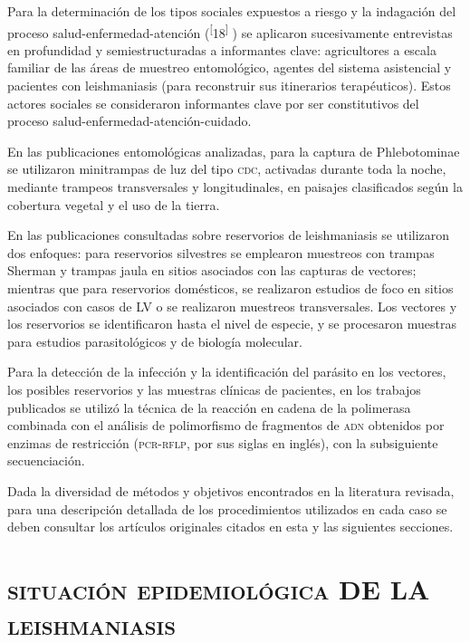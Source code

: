\documentclass{article}
\begin{document}
Para la determinación de los tipos sociales expuestos a riesgo y la indagación
del proceso salud-enfermedad-atención (\textsuperscript{[}18\textsuperscript{]}
) se aplicaron sucesivamente entrevistas en profundidad y semiestructuradas a
informantes clave: agricultores a escala familiar de las áreas de muestreo
entomológico, agentes del sistema asistencial y pacientes con leishmaniasis
(para reconstruir sus itinerarios terapéuticos). Estos actores sociales se
consideraron informantes clave por ser constitutivos del proceso
salud-enfermedad-atención-cuidado.

En las publicaciones entomológicas analizadas, para la captura de Phlebotominae
se utilizaron minitrampas de luz del tipo \textsc{cdc}, activadas durante toda la noche,
mediante trampeos transversales y longitudinales, en paisajes clasificados según
la cobertura vegetal y el uso de la tierra.

En las publicaciones consultadas sobre reservorios de leishmaniasis se
utilizaron dos enfoques: para reservorios silvestres se emplearon muestreos con
trampas Sherman y trampas jaula en sitios asociados con las capturas de
vectores; mientras que para reservorios domésticos, se realizaron estudios de
foco en sitios asociados con casos de LV o se realizaron muestreos
transversales. Los vectores y los reservorios se identificaron hasta el nivel de
especie, y se procesaron muestras para estudios parasitológicos y de biología
molecular.

Para la detección de la infección y la identificación del parásito en los
vectores, los posibles reservorios y las muestras clínicas de pacientes, en los
trabajos publicados se utilizó la técnica de la reacción en cadena de la
polimerasa combinada con el análisis de polimorfismo de fragmentos de \textsc{adn}
obtenidos por enzimas de restricción (\textsc{pcr}-\textsc{rflp}, por sus siglas en inglés), con
la subsiguiente secuenciación.

Dada la diversidad de métodos y objetivos encontrados en la literatura revisada,
para una descripción detallada de los procedimientos utilizados en cada caso se
deben consultar los artículos originales citados en esta y las siguientes
secciones.

\section{\textsc{situación} \textsc{epidemiológica} DE LA \textsc{leishmaniasis}}
\end{document}
